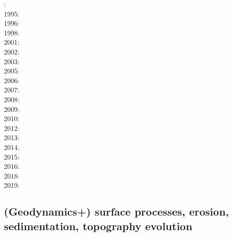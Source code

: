 :\cite{yusa84}\\
1995:\cite{budi95}\\
1996:\cite{hach96}\\
1998:\cite{copo98}\\
2001:\cite{vapy01}\\
2002:\cite{mumh02}\cite{modm02}\\
2003:\cite{hukm03}\cite{wabu03}\\
2005:\cite{mure05}\\
2006:\cite{kapo06}\cite{mudm06}\\
2007:\cite{kabe07}\\
2008:\cite{baso08}\cite{fukk08}\\
2009:\cite{qurj09}\\
2010:\cite{bepo10}\\
2012:\cite{gerb12}\\
2013:\cite{wahd13}\\
2014:\cite{famc14}\cite{fogm14}\\
2015:\cite{thkp15}\\
2016:\cite{bafl16}\cite{jads16}\cite{olbm16}\cite{bafl16}\\
2018:\cite{dusd18}\\
2019:\cite{pact19}

\subsection*{(Geodynamics+) surface processes, erosion, sedimentation, topography evolution}
 

